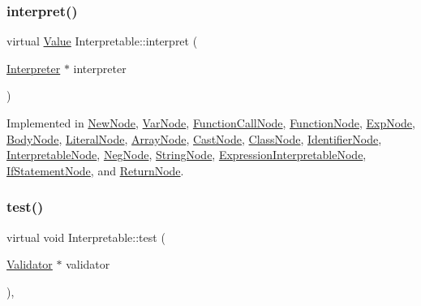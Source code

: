 \subsubsection{\texorpdfstring{interpret()}{interpret()}}
{\footnotesize\ttfamily virtual \hyperlink{classValue}{Value} Interpretable\+::interpret (\begin{DoxyParamCaption}\item[{\hyperlink{classInterpreter}{Interpreter} $\ast$}]{interpreter }\end{DoxyParamCaption})\hspace{0.3cm}{\ttfamily [pure virtual]}}



Implemented in \hyperlink{classNewNode_a77447b9402f0153401bf0e623b5f1e6e}{New\+Node}, \hyperlink{classVarNode_af2eed4fcade96d174c5b1f623b6bcdf6}{Var\+Node}, \hyperlink{classFunctionCallNode_a1d0d8806b7dd501ed43da58f77f7c49e}{Function\+Call\+Node}, \hyperlink{classFunctionNode_a059e6682cd51d0e126372a7af257ea5a}{Function\+Node}, \hyperlink{classExpNode_aedff3b19b9e36a77e4558a168b81debf}{Exp\+Node}, \hyperlink{classBodyNode_a5ab94984d059dba1f7d2baa6022712ba}{Body\+Node}, \hyperlink{classLiteralNode_abb32ed943c6a5b2029a496ac04885b2a}{Literal\+Node}, \hyperlink{classArrayNode_a029220b946233e22cb661fcfac9634d0}{Array\+Node}, \hyperlink{classCastNode_a2a909a7531791bcbc53c514a01ce5024}{Cast\+Node}, \hyperlink{classClassNode_a7515421face64d74e99e180fb297684b}{Class\+Node}, \hyperlink{classIdentifierNode_aa7be7da3e018352f8b549fcac3a8155a}{Identifier\+Node}, \hyperlink{classInterpretableNode_a9a466e7d65c4b323d2b96b4ac8396cd7}{Interpretable\+Node}, \hyperlink{classNegNode_a35ff48d55ab355e27f33dcc21483e4c7}{Neg\+Node}, \hyperlink{classStringNode_ae92c0858cd07baf0c6417f7bdfce9f0d}{String\+Node}, \hyperlink{classExpressionInterpretableNode_a43650f046c48fc539f77a207e3c9181e}{Expression\+Interpretable\+Node}, \hyperlink{classIfStatementNode_aef627f32330e55f8bb9e5ac2f2f5f3f8}{If\+Statement\+Node}, and \hyperlink{classReturnNode_ae6c35829787a4f880b3ee1fa4b2e98d3}{Return\+Node}.

\mbox{\label{classInterpretable_a32f547aaf68dcbab993284d3257ab010}} 
\subsubsection{\texorpdfstring{test()}{test()}}
{\footnotesize\ttfamily virtual void Interpretable\+::test (\begin{DoxyParamCaption}\item[{\hyperlink{classValidator}{Validator} $\ast$}]{validator }\end{DoxyParamCaption})\hspace{0.3cm}{\ttfamily [inline]}, {\ttfamily [virtual]}}



